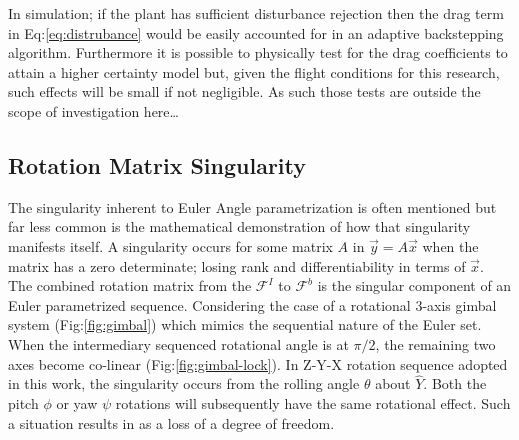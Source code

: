 \par
In simulation; if the plant has sufficient disturbance rejection then the drag term in Eq:\ref{eq:distrubance} would be easily accounted for in an adaptive backstepping algorithm. Furthermore it is possible to physically test for the drag coefficients to attain a higher certainty model but, given the flight conditions for this research, such effects will be small if not negligible. As such those tests are outside the scope of investigation here\ldots
\subsection{Rotation Matrix Singularity}\label{subsec:dynamics.rigidbody.singularity}
The singularity inherent to Euler Angle parametrization is often mentioned but far less common is the mathematical demonstration of how that singularity manifests itself.  A singularity occurs for some matrix $A$ in $\vec{y}=A\vec{x}$ when the matrix has a zero determinate; losing rank and differentiability in terms of $\vec{x}$. The combined rotation matrix from the $\mathcal{F}^{I}$ to $\mathcal{F}^{b}$ is the singular component of an Euler parametrized sequence. Considering the case of a rotational 3-axis gimbal system (Fig:\ref{fig:gimbal}) which mimics the sequential nature of the Euler set. When the intermediary sequenced rotational angle is at $\pi/2$, the remaining two axes become co-linear (Fig:\ref{fig:gimbal-lock}). In Z-Y-X rotation sequence adopted in this work, the singularity occurs from the rolling angle $\theta$ about $\hat{Y}$. Both the pitch $\phi$ or yaw $\psi$ rotations will subsequently have the same rotational effect. Such a situation results in as a loss of a degree of freedom.
